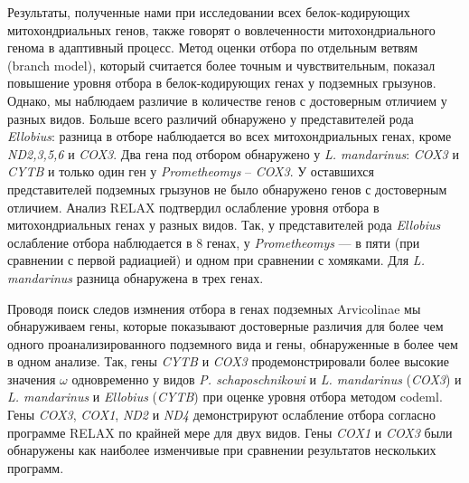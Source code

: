 Результаты, полученные нами при исследовании всех белок-кодирующих митохондриальных генов, также говорят о вовлеченности митохондриального генома в адаптивный процесс. Метод оценки отбора по отдельным ветвям (branch model), который считается более точным и чувствительным, показал повышение уровня отбора в белок-кодирующих генах у подземных грызунов. Однако, мы наблюдаем различие в количестве генов с достоверным отличием у разных видов. Больше всего различий обнаружено у представителей рода \textit{Ellobius}: разница в отборе наблюдается во всех митохондриальных генах, кроме \textit{ND2,3,5,6} и \textit{COX3}. Два гена под отбором обнаружено у \textit{L. mandarinus}: \textit{COX3} и \textit{CYTB} и только один ген у \textit{Prometheomys} -- \textit{COX3}. У оставшихся представителей подземных грызунов не было обнаружено генов с достоверным отличием. Анализ RELAX подтвердил ослабление уровня отбора в митохондриальных генах у разных видов. Так, у представителей рода \textit{Ellobius} ослабление отбора наблюдается в 8 генах, у \textit{Prometheomys} --- в пяти (при сравнении с первой радиацией) и одном при сравнении с хомяками. Для \textit{L. mandarinus} разница обнаружена в трех генах.  

Проводя поиск следов измнения отбора в генах подземных Arvicolinae мы обнаруживаем гены, которые показывают достоверные различия для более чем одного проанализированного подземного вида и гены, обнаруженные в более чем в одном анализе. Так, гены \textit{CYTB} и \textit{COX3} продемонстрировали более высокие значения $\omega$ одновременно у видов \textit{P. schaposchnikowi} и \textit{L. mandarinus} (\textit{COX3}) и \textit{L. mandarinus} и \textit{Ellobius} (\textit{CYTB}) при оценке уровня отбора методом codeml. Гены \textit{COX3}, \textit{COX1}, \textit{ND2} и \textit{ND4} демонстрируют ослабление отбора согласно программе RELAX по крайней мере для двух видов. Гены \textit{COX1} и \textit{COX3} были обнаружены как наиболее изменчивые при сравнении результатов нескольких программ. 

